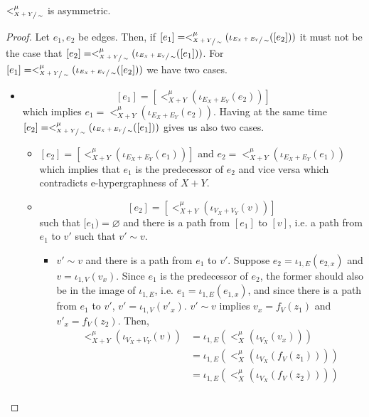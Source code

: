 \begin{lemma}
\label{lemma:child_assymetric}
    $<_{\sfrac{X+Y}{\sim}}^{\mu}$ is asymmetric.
\end{lemma}
\begin{proof}
    Let $e_1,e_2$ be edges. 
    Then, if $[e_1] = <_{\sfrac{X+Y}{\sim}}^{\mu}(\iota_{\sfrac{E_{X} + E_{Y}}{\sim}}([e_2]))$ it must not be the case that $[e_2] = <_{\sfrac{X+Y}{\sim}}^{\mu}(\iota_{\sfrac{E_{X} + E_{Y}}{\sim}}([e_1]))$.
    For $[e_1] = <_{\sfrac{X+Y}{\sim}}^{\mu}(\iota_{\sfrac{E_{X} + E_{Y}}{\sim}}([e_2]))$ we have two cases.
    \begin{itemize}
      \item 
      \[
        [e_1] = [<_{X+Y}^{\mu}(\iota_{E_{X} + E_{Y}}(e_2))]
      \]
      which implies $e_1 = <_{X+Y}^{\mu}(\iota_{E_{X} + E_{Y}}(e_2))$.
      Having at the same time $[e_2] = <_{\sfrac{X+Y}{\sim}}^{\mu}(\iota_{\sfrac{E_{X} + E_{Y}}{\sim}}([e_1]))$ gives us also two cases.
      \begin{itemize}
        \item $[e_2] = [<_{X+Y}^{\mu}(\iota_{E_{X} + E_{Y}}(e_1))]$ and $e_2 = <_{X+Y}^{\mu}(\iota_{E_{X} + E_{Y}}(e_1))$ which implies that $e_1$ is the predecessor of $e_2$ and vice versa which contradicts e-hypergraphness of $X+Y$.
        \item
            \[
                [e_2] = [<_{X+Y}^{\mu}(\iota_{V_{X} + V_{Y}}(v))]
            \]
            such that $[e_1) = \varnothing$ and there is a path from $[e_1]$ to $[v]$, i.e. a path from $e_1$ to $v'$ such that $v' \sim v$.
            \begin{itemize}
                \item $v' \sim v$ and there is a path from $e_1$ to $v'$. 
                Suppose $e_2 = \iota_{1,E}(e_{2,x})$ and $v = \iota_{1,V}(v_{x})$.
                Since $e_1$ is the predecessor of $e_2$, the former should also be in the image of $\iota_{1,E}$, i.e. $e_1 = \iota_{1,E}(e_{1,x})$, and since there is a path from $e_1$ to $v'$, $v' = \iota_{1,V}(v'_{x})$.
                $v' \sim v$ implies $v_{x} = f_{V}(z_1)$ and $v'_{x} = f_{V}(z_2)$.
                Then,
                \begin{align*}
                    <_{X+Y}^{\mu}(\iota_{V_{X} + V_{Y}}(v)) &= \iota_{1,E}(<_{X}^{\mu}(\iota_{V_{X}}(v_{x})))\\
                                                            &= \iota_{1,E}(<_{X}^{\mu}(\iota_{V_{X}}(f_{V}(z_1))))\\
                                                            &= \iota_{1,E}(<_{X}^{\mu}(\iota_{V_{X}}(f_{V}(z_2))))\\

\end{align*}
\end{itemize}
\end{itemize}
\end{itemize}
\end{proof}
